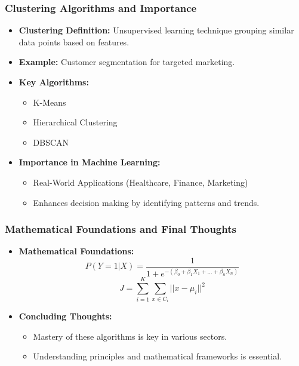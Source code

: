 \documentclass[aspectratio=169]{beamer}
\begin{document}
\begin{frame}[fragile]
    \frametitle{Clustering Algorithms and Importance}
    \begin{itemize}
        \item \textbf{Clustering Definition:} Unsupervised learning technique grouping similar data points based on features.
        \item \textbf{Example:} Customer segmentation for targeted marketing.
        \item \textbf{Key Algorithms:}
        \begin{itemize}
            \item K-Means
            \item Hierarchical Clustering
            \item DBSCAN
        \end{itemize}
        \item \textbf{Importance in Machine Learning:}
        \begin{itemize}
            \item Real-World Applications (Healthcare, Finance, Marketing)
            \item Enhances decision making by identifying patterns and trends.
        \end{itemize}
    \end{itemize}
\end{frame}

\begin{frame}[fragile]
    \frametitle{Mathematical Foundations and Final Thoughts}
    \begin{itemize}
        \item \textbf{Mathematical Foundations:}
        \begin{equation}
            P(Y=1|X) = \frac{1}{1 + e^{-(\beta_0 + \beta_1X_1 + ... + \beta_nX_n)}}
        \end{equation}
        \begin{equation}
            J = \sum_{i=1}^{K} \sum_{x \in C_i} || x - \mu_i ||^2
        \end{equation}
        
        \item \textbf{Concluding Thoughts:}
        \begin{itemize}
            \item Mastery of these algorithms is key in various sectors.
            \item Understanding principles and mathematical frameworks is essential.
        \end{itemize}
    \end{itemize}
\end{frame}
\end{document}
